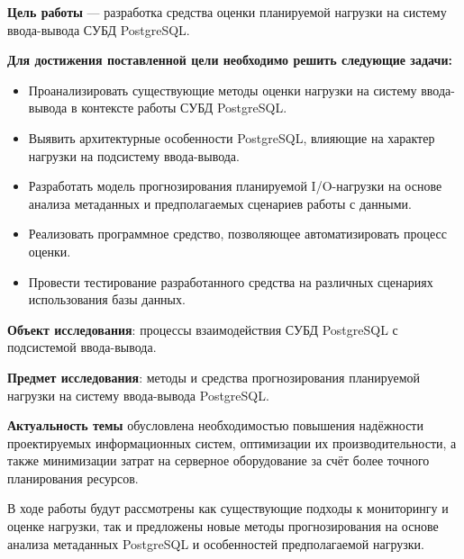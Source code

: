 \textbf{Цель работы} — разработка средства оценки планируемой нагрузки на систему ввода-вывода СУБД PostgreSQL.\

\vspace{5mm}

\textbf{Для достижения поставленной цели необходимо решить следующие задачи:}
\begin{itemize}[leftmargin=*,align=left]
    \item Про\-анализи\-ровать су\-ще\-ствую\-щие ме\-то\-ды оцен\-ки на\-груз\-ки на си\-сте\-му вво\-да-вы\-во\-да в кон\-тек\-сте ра\-бо\-ты \mbox{СУБД} PostgreSQL.\
    \item Вы\-я\-вить ар\-хи\-тек\-тур\-ные осо\-бен\-но\-сти Post\-gre\-SQL, вли\-яю\-щие на ха\-рак\-тер на\-груз\-ки на под\-си\-сте\-му вво\-да-вы\-во\-да.\
    \item Раз\-ра\-бо\-тать мо\-дель про\-гно\-зи\-ро\-ва\-ния пла\-ни\-ру\-е\-мой I/O-на\-груз\-ки на ос\-но\-ве ана\-ли\-за ме\-та\-дан\-ных и пред\-по\-ла\-га\-е\-мых сце\-на\-ри\-ев ра\-бо\-ты с дан\-ны\-ми.\
    \item Ре\-а\-ли\-зо\-вать про\-грамм\-ное сред\-ство, по\-зво\-ля\-ю\-щее ав\-то\-ма\-ти\-зи\-ро\-вать про\-цесс оцен\-ки.\
    \item Про\-вес\-ти тес\-ти\-ро\-ва\-ние раз\-ра\-бо\-тан\-но\-го сред\-ства на раз\-лич\-ных сце\-на\-ри\-ях ис\-поль\-зо\-ва\-ния ба\-зы дан\-ных.\
\end{itemize}

\vspace{5mm}

\textbf{Объект исследования}: процессы взаимодействия СУБД PostgreSQL с подсистемой ввода-вывода.

\textbf{Предмет исследования}: методы и средства прогнозирования планируемой нагрузки на систему ввода-вывода PostgreSQL.

\vspace{5mm}

\textbf{Актуальность темы} обусловлена необходимостью повышения надёжности проектируемых информационных систем, оптимизации их производительности, а также минимизации затрат на серверное оборудование за счёт более точного планирования ресурсов.

\vspace{5mm}

В ходе работы будут рассмотрены как существующие подходы к мониторингу и оценке нагрузки, так и предложены новые методы прогнозирования на основе анализа метаданных PostgreSQL и особенностей предполагаемой нагрузки.
